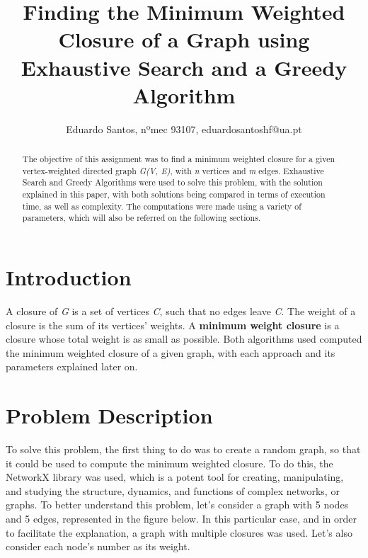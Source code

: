 \documentclass[...]{revdetua}
\begin{document}

\title{Finding the Minimum Weighted Closure of a Graph using Exhaustive Search and a Greedy Algorithm}
\author{Eduardo Santos, nºmec 93107, eduardosantoshf@ua.pt} %
\maketitle

\begin{abstract}
The objective of this assignment was to find a minimum weighted closure for a given vertex-weighted directed graph \textit{G(V, E)}, with \textit{n} vertices and \textit{m} edges. Exhaustive Search and Greedy Algorithms were used to solve this problem, with the solution explained in this paper, with both solutions being compared in terms of execution time, as well as complexity. The computations were made using a variety of parameters, which will also be referred on the following sections.
\end{abstract}

\section{Introduction}

A closure of \textit{G} is a set of vertices \textit{C}, such that no edges leave \textit{C}. The weight of a closure is the sum of its vertices’ weights. A \textbf{minimum weight closure} is a closure whose total weight is as small as possible. Both algorithms used computed the minimum weighted closure of a given graph, with each approach and its parameters explained later on.

\section{ Problem Description}

To solve this problem, the first thing to do was to create a random graph, so that it could be used to compute the minimum weighted closure. To do this, the NetworkX\cite{networkx} library was used, which is a potent tool for creating, manipulating, and studying the structure, dynamics, and functions of complex networks, or graphs.
To better understand this problem, let's consider a graph with 5 nodes and 5 edges, represented in the figure below. In this particular case, and in order to facilitate the explanation, a graph with multiple closures was used. Let's also consider each node's number as its weight. 
\end{document}
